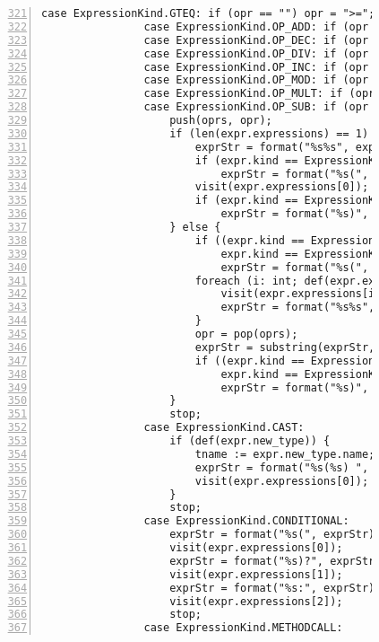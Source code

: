 \begin{figure}[ht!]
\begin{lstlisting}[numbers=left, tabsize=4, escapechar=@, caption={API Usage Mining Analysis},label={lst:aun-code},  firstline = 321, firstnumber = 321, lastline = 381]
                case ExpressionKind.GTEQ: if (opr == "") opr = ">=";
                case ExpressionKind.OP_ADD: if (opr == "") opr = "+";
                case ExpressionKind.OP_DEC: if (opr == "") opr = "--";
                case ExpressionKind.OP_DIV: if (opr == "") opr = "/"; 
                case ExpressionKind.OP_INC: if (opr == "") opr = "++"; 
                case ExpressionKind.OP_MOD: if (opr == "") opr = "%"; 
                case ExpressionKind.OP_MULT: if (opr == "") opr = "*";
                case ExpressionKind.OP_SUB: if (opr == "") opr = "-";
                    push(oprs, opr);
                    if (len(expr.expressions) == 1) {
                        exprStr = format("%s%s", exprStr, pop(oprs));
                        if (expr.kind == ExpressionKind.LOGICAL_NOT)
                            exprStr = format("%s(", exprStr);
                        visit(expr.expressions[0]);
                        if (expr.kind == ExpressionKind.LOGICAL_NOT)
                            exprStr = format("%s)", exprStr);
                    } else {
                        if ((expr.kind == ExpressionKind.ASSIGN && isPP) ||
                            expr.kind == ExpressionKind.LOGICAL_NOT) 
                            exprStr = format("%s(", exprStr);
                        foreach (i: int; def(expr.expressions[i])) {
                            visit(expr.expressions[i]);
                            exprStr = format("%s%s", exprStr, peek(oprs));
                        }
                        opr = pop(oprs);
                        exprStr = substring(exprStr, 0, (len(exprStr)-len(opr)));
                        if ((expr.kind == ExpressionKind.ASSIGN && isPP) ||
                            expr.kind == ExpressionKind.LOGICAL_NOT) 
                            exprStr = format("%s)", exprStr);
                    }
		            stop;
                case ExpressionKind.CAST:
                    if (def(expr.new_type)) {
                        tname := expr.new_type.name;
                        exprStr = format("%s(%s) ", exprStr, tname);
                        visit(expr.expressions[0]); 
                    }
                    stop;
                case ExpressionKind.CONDITIONAL:
                    exprStr = format("%s(", exprStr);
                    visit(expr.expressions[0]);
                    exprStr = format("%s)?", exprStr);
                    visit(expr.expressions[1]);
                    exprStr = format("%s:", exprStr);
                    visit(expr.expressions[2]);
                    stop;
                case ExpressionKind.METHODCALL:

\end{lstlisting}
\end{figure}
